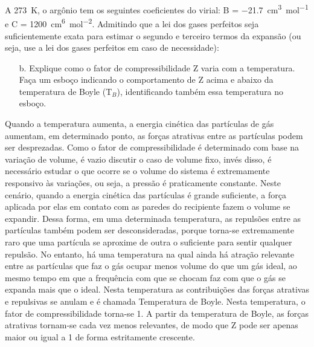 \begin{xcs}
    A \qty{273}{K}, o argônio tem os seguintes coeficientes do virial: 
    B = \qty{-21,7}{cm^3 mol^{-1}} e C = \qty{1200}{cm^6 mol^{-2}}.
    Admitindo que a lei dos gases perfeitos seja
    suficientemente exata para estimar o segundo e terceiro termos da expansão
    (ou seja, use a lei dos gases perfeitos em caso de necessidade): 
    \begin{enumerate}[label=\alph*.]
        \item[b.] Explique como o fator de compressibilidade Z varia com a
            temperatura. Faça um esboço indicando o comportamento de Z acima e
            abaixo da temperatura de Boyle (T\(_B\)), identificando também essa
            temperatura no esboço. 
    \end{enumerate}
\end{xcs}
\begin{rsl}
    Quando a temperatura aumenta, a energia cinética das partículas de gás
    aumentam, em determinado ponto, as forças atrativas entre as partículas
    podem ser desprezadas. Como o fator de compressibilidade é determinado com
    base na variação de volume, é vazio discutir o caso de volume fixo, invés
    disso, é necessário estudar o que ocorre se o volume do sistema é
    extremamente responsivo às variações, ou seja, a pressão é praticamente
    constante. Neste cenário, quando a energia cinética das partículas é grande
    suficiente, a força aplicada por elas em contato com as paredes do
    recipiente fazem o volume se expandir. Dessa forma, em uma determinada
    temperatura, as repulsões entre as partículas também podem ser
    desconsideradas, porque torna-se extremamente raro que uma partícula se
    aproxime de outra o suficiente para sentir qualquer repulsão. No entanto, há
    uma temperatura na qual ainda há atração relevante entre as partículas que
    faz o gás ocupar menos volume do que um gás ideal, ao mesmo tempo em que a
    frequência com que se chocam faz com que o gás se expanda mais que o ideal.
    Nesta temperatura as contribuições das forças atrativas e repulsivas se
    anulam e é chamada Temperatura de Boyle. Nesta temperatura, o fator de
    compressibilidade torna-se 1. A partir da temperatura de Boyle, as forças
    atrativas tornam-se cada vez menos relevantes, de modo que Z pode ser apenas
    maior ou igual a 1 de forma estritamente crescente.
\end{rsl}
